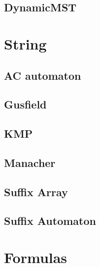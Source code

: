 \subsection{DynamicMST}

\section{String}
\subsection{AC automaton}

\subsection{Gusfield}

\subsection{KMP}

\subsection{Manacher}

\subsection{Suffix Array}

\subsection{Suffix Automaton}


\section{Formulas}
